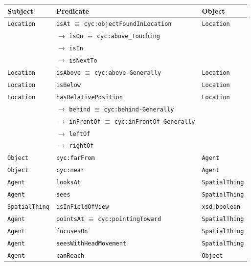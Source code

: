 \documentclass[compress]{beamer}
\newcommand{\concept}[1]{{\scriptsize \texttt{#1}}}
\begin{document}
\begin{frame}{}
        \centering
        \scriptsize

        \begin{tabular}{p{1.5cm}lp{2cm}}
            Subject & Predicate  & Object  \\ 
            \hline
            \concept{Location} & \concept{isAt} $\equiv$ \concept{cyc:objectFoundInLocation}  &  \concept{Location}  \\ 
                               &  $\rightarrow$ \concept{isOn} $\equiv$ \concept{cyc:above\_Touching}  &   \\ 
                               &  $\rightarrow$ \concept{isIn}  &   \\ 
                               &  $\rightarrow$ \concept{isNextTo}  &   \\ 

            \concept{Location}  & \concept{isAbove} $\equiv$ \concept{cyc:above-Generally}  &  \concept{Location} \\ 
            \concept{Location}  & \concept{isBelow}  & \concept{Location} \\
            \hline
            \concept{Location}  & \concept{hasRelativePosition}  & \concept{Location}  \\ 
                                   & 	$\rightarrow$ \concept{behind} $\equiv$ \concept{cyc:behind-Generally}  & \\ 
                                      &  $\rightarrow$ \concept{inFrontOf} $\equiv$ \concept{cyc:inFrontOf-Generally}  & \\ 
                                         &  $\rightarrow$ \concept{leftOf}  &  \\ 
                                            &  $\rightarrow$ \concept{rightOf}  & 	 \\ 
            \concept{Object}  & \concept{cyc:farFrom}  &  \concept{Agent} \\ 
            \concept{Object}  & \concept{cyc:near}  &  \concept{Agent} \\

            \hline
            \concept{Agent}  & \concept{looksAt}  & \concept{SpatialThing} \\
            \concept{Agent}  & \concept{sees}  &  \concept{SpatialThing}  \\ 
            \concept{SpatialThing}  & \concept{isInFieldOfView}  & \concept{xsd:boolean}  \\ 
            \concept{Agent}  & \concept{pointsAt} $\equiv$ \concept{cyc:pointingToward}  & \concept{SpatialThing} \\ 
            \concept{Agent}  & \concept{focusesOn}  &  \concept{SpatialThing}  \\ 
            \concept{Agent} & \concept{seesWithHeadMovement} &  \concept{SpatialThing} \\
            \concept{Agent} & \concept{canReach} &  \concept{Object} \\ 

        \end{tabular}

\end{frame}
\end{document}
